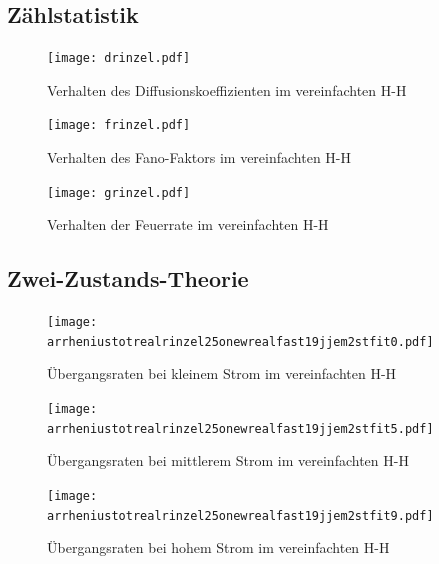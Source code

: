 \documentclass[12pt,a4paper]{article}
\begin{document}
\subsection{Zählstatistik}
\begin{figure}[H]
	\centering
	\texttt{[image: drinzel.pdf]}\caption{Verhalten des Diffusionskoeffizienten im vereinfachten H-H}
	\label{drinzel}
\end{figure}
\begin{figure}[H]
	\centering
	\texttt{[image: frinzel.pdf]}\caption{Verhalten des Fano-Faktors im vereinfachten H-H}
	\label{frinzel}
\end{figure}
\begin{figure}[H]
	\centering
	\texttt{[image: grinzel.pdf]}\caption{Verhalten der Feuerrate im vereinfachten H-H}
	\label{grinzel}
\end{figure}
\subsection{Zwei-Zustands-Theorie}
\begin{figure}[H]
	\centering
	\texttt{[image: arrheniustotrealrinzel25onewrealfast19jjem2stfit0.pdf]}\caption{Übergangsraten bei kleinem Strom im vereinfachten H-H}
	\label{arrhrinzel1}
\end{figure}
\begin{figure}[H]
	\centering
	\texttt{[image: arrheniustotrealrinzel25onewrealfast19jjem2stfit5.pdf]}\caption{Übergangsraten bei mittlerem Strom im vereinfachten H-H}
	\label{arrhrinzel2}
\end{figure}
\begin{figure}[H]
	\centering
	\texttt{[image: arrheniustotrealrinzel25onewrealfast19jjem2stfit9.pdf]}\caption{Übergangsraten bei hohem Strom im vereinfachten H-H}
	\label{arrhrinzel3}
\end{figure}
\end{document}
